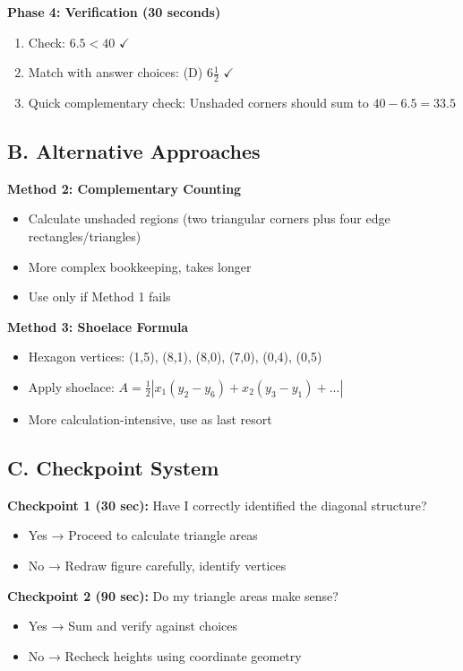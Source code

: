 \documentclass[11pt]{article}
\begin{document}
\begin{roadmapbox}
\textbf{Phase 4: Verification (30 seconds)}
\begin{enumerate}
    \item Check: $6.5 < 40$ $\checkmark$
    \item Match with answer choices: (D) $6\frac{1}{2}$ $\checkmark$
    \item Quick complementary check: Unshaded corners should sum to $40 - 6.5 = 33.5$
\end{enumerate}

\subsection*{B. Alternative Approaches}

\textbf{Method 2: Complementary Counting}
\begin{itemize}
    \item Calculate unshaded regions (two triangular corners plus four edge rectangles/triangles)
    \item More complex bookkeeping, takes longer
    \item Use only if Method 1 fails
\end{itemize}

\textbf{Method 3: Shoelace Formula}
\begin{itemize}
    \item Hexagon vertices: (1,5), (8,1), (8,0), (7,0), (0,4), (0,5)
    \item Apply shoelace: $A = \frac{1}{2}|x_1(y_2-y_6) + x_2(y_3-y_1) + ...|$
    \item More calculation-intensive, use as last resort
\end{itemize}

\subsection*{C. Checkpoint System}

\textbf{Checkpoint 1 (30 sec):} Have I correctly identified the diagonal structure?
\begin{itemize}
    \item Yes → Proceed to calculate triangle areas
    \item No → Redraw figure carefully, identify vertices
\end{itemize}

\textbf{Checkpoint 2 (90 sec):} Do my triangle areas make sense?
\begin{itemize}
    \item Yes → Sum and verify against choices
    \item No → Recheck heights using coordinate geometry
\end{itemize}


\end{roadmapbox}
\end{document}

